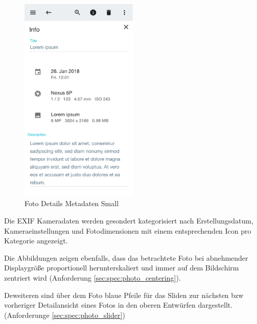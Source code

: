 \begin{figure}[htp]     %
\centering
\includegraphics[width=0.5\textwidth]{images/form_small} 
\caption{Foto Details Metadaten Small}\label{fig:form_small}
\end{figure}

Die EXIF Kameradaten werden gesondert kategorisiert nach Erstellungsdatum, Kameraeinstellungen und Fotodimensionen mit einem entsprechenden Icon pro Kategorie angezeigt.

Die Abbildungen zeigen ebenfalls, dass das betrachtete Foto bei abnehmender Displaygröße proportionell herunterskaliert und immer auf dem Bildschirm zentriert wird (Anforderung \ref{sec:spec:photo_centering}).

Deweiteren sind über dem Foto blaue Pfeile für das Sliden zur nächsten bzw vorheriger Detailansicht eines Fotos in den oberen Entwürfen dargestellt. 
(Anforderunge \ref{sec:spec:photo_slider})
